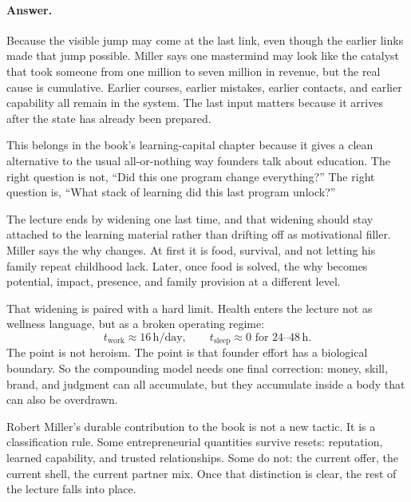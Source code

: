 \documentclass[11pt,oneside]{book}
\begin{document}
\paragraph{Answer.}
Because the visible jump may come at the last link, even though the earlier links made that jump possible. Miller says one mastermind may look like the catalyst that took someone from one million to seven million in revenue, but the real cause is cumulative. Earlier courses, earlier mistakes, earlier contacts, and earlier capability all remain in the system. The last input matters because it arrives after the state has already been prepared.

This belongs in the book's learning-capital chapter because it gives a clean alternative to the usual all-or-nothing way founders talk about education. The right question is not, ``Did this one program change everything?'' The right question is, ``What stack of learning did this last program unlock?''

The lecture ends by widening one last time, and that widening should stay attached to the learning material rather than drifting off as motivational filler. Miller says the why changes. At first it is food, survival, and not letting his family repeat childhood lack. Later, once food is solved, the why becomes potential, impact, presence, and family provision at a different level.

That widening is paired with a hard limit. Health enters the lecture not as wellness language, but as a broken operating regime:
\[
t_{\text{work}} \approx 16\,\mathrm{h/day},
\qquad
t_{\text{sleep}} \approx 0 \text{ for }24\text{--}48\,\mathrm{h}.
\]
The point is not heroism. The point is that founder effort has a biological boundary. So the compounding model needs one final correction: money, skill, brand, and judgment can all accumulate, but they accumulate inside a body that can also be overdrawn.

\begin{remark}
Robert Miller's durable contribution to the book is not a new tactic. It is a classification rule. Some entrepreneurial quantities survive resets: reputation, learned capability, and trusted relationships. Some do not: the current offer, the current shell, the current partner mix. Once that distinction is clear, the rest of the lecture falls into place.
\end{remark}

\end{document}

